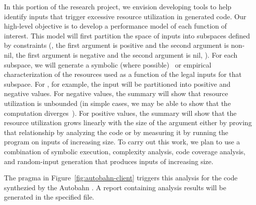 In this portion of the \rasp{} research project, we envision
developing tools to help identify inputs that trigger excessive
resource utilization in generated code.
Our high-level objective is to develop a performance model of each
function of interest.   This model will first partition the space of inputs into
subspaces defined by constraints (\eg{}, the first argument is
positive and the second argument is non-nil, the first argument is
negative and the second argument is nil, \etc{}).  For each subspace,
we will generate a symbolic (where possible)~\cite{Hoffmann17} or
empirical~\cite{Goldsmith07}
characterization of the resources used as a function of the legal
inputs for that subspace.   For , for example, the input
will be partitioned into positive and negative values.  For negative
values, the summary will show that resource utilization is unbounded
(in simple cases, we may be able to show that the computation
diverges~\cite{Gupta08}).
For positive values, the summary will show that the resource
utilization grows linearly with the size of the argument either by
proving that relationship by analyzing the code or by measuring it by
running the program on inputs of increasing size.
To carry out this work, we plan to use a combination of symbolic
execution, complexity analysis, code coverage analysis, and
random-input generation that produces inputs of increasing size.

The  pragma in Figure~\ref{fig:autobahn-client}
triggers this analysis for the code synthezied by the Autobahn \rasp{}.
A report containing analysis results will be generated in the
specified file.








